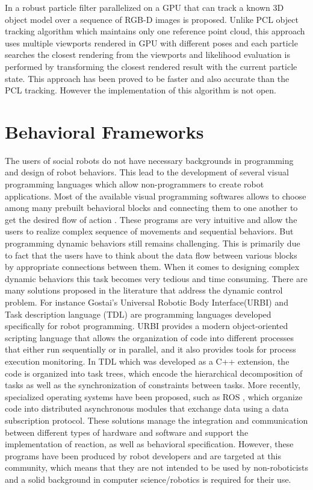 In \cite{choi2013rgb} a robust particle filter parallelized on a GPU that can track a known 3D object model over a sequence of RGB-D images is proposed. Unlike PCL object tracking algorithm \cite{rusu20113d} which maintains only one reference point cloud, this approach uses multiple viewports rendered in GPU with different poses and each particle searches the closest rendering from the viewports and likelihood evaluation is performed by transforming the closest rendered result with the current particle state. This approach has been proved to be faster and also accurate than the PCL tracking. However the implementation of this algorithm is not open.
\section{Behavioral Frameworks} %
The users of social robots do not have necessary backgrounds in programming and design of robot behaviors. This lead to the development of several visual programming languages which allow non-programmers to create robot applications. Most of the available visual programming softwares allows to choose among many prebuilt behavioral blocks and connecting them to one another to get the desired flow of action \cite{MSRS4} \cite{Choregraphe}. These programs are very intuitive and allow the users to realize complex sequence of movements and sequential behaviors. But programming dynamic behaviors still remains challenging. This is primarily due to fact that the users have to think about the data flow between various blocks by appropriate connections between them. When it comes to designing complex dynamic behaviors this task becomes very tedious and time consuming. There are many solutions proposed in the literature that address the dynamic control problem. For instance Gostai's Universal Robotic Body Interface(URBI) \cite{baillie2008urbi} and Task description language (TDL) \cite{simmons1998task} are programming languages developed specifically for robot programming. URBI provides a modern object-oriented scripting language that allows the organization of code into different processes that either run sequentially or in parallel, and it also provides tools for process execution monitoring. In TDL which was developed as a C++ extension, the code is organized into task trees, which encode the hierarchical decomposition of tasks as well as the synchronization of constraints between tasks. More recently, specialized operating systems have been proposed, such as ROS \cite{quigley2009ros}, which organize code into distributed asynchronous modules that exchange data using a data subscription protocol. These solutions manage the integration and communication between different types of hardware and software and support the implementation of reaction, as well as behavioral specification. However, these programs have been produced by robot developers and are targeted at this community, which means that they are not intended to be used by non-roboticists and a solid background in computer science/robotics is required for their use.

